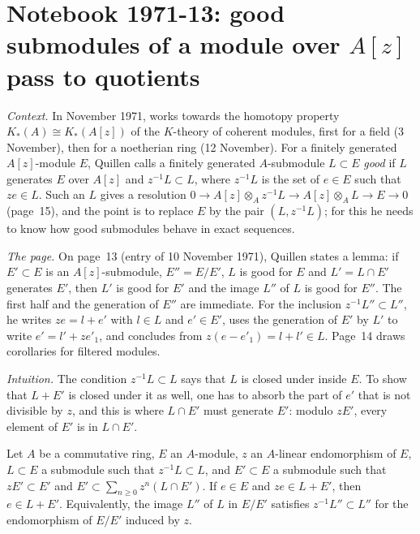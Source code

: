 \section[Notebook 1971-13: good submodules pass to quotients]{Notebook 1971-13: good submodules of a module over $A[z]$ pass to quotients\protect{}}\label{sec:quillen-1971-13}

\emph{Context.} In November 1971,  works towards the homotopy property $K_*(A) \cong K_*(A[z])$ of the $K$-theory of coherent modules, first for a field (3 November), then for a noetherian ring (12 November). For a finitely generated $A[z]$-module $E$, Quillen calls a finitely generated $A$-submodule $L \subset E$ \emph{good} if $L$ generates $E$ over $A[z]$ and $z^{-1}L \subset L$, where $z^{-1}L$ is the set of $e \in E$ such that $ze \in L$. Such an $L$ gives a resolution $0 \to A[z] \otimes_A z^{-1}L \to A[z] \otimes_A L \to E \to 0$ (page~15), and the point is to replace $E$ by the pair $(L, z^{-1}L)$; for this he needs to know how good submodules behave in exact sequences.

\emph{The page.} On page~13 (entry of 10 November 1971), Quillen states a lemma: if $E' \subset E$ is an $A[z]$-submodule, $E'' = E/E'$, $L$ is good for $E$ and $L' = L \cap E'$ generates $E'$, then $L'$ is good for $E'$ and the image $L''$ of $L$ is good for $E''$. The first half and the generation of $E''$ are immediate. For the inclusion $z^{-1}L'' \subset L''$, he writes $ze = l + e'$ with $l \in L$ and $e' \in E'$, uses the generation of $E'$ by $L'$ to write $e' = l' + z e'_1$, and concludes from $z(e - e'_1) = l + l' \in L$. Page~14 draws corollaries for filtered modules.

\emph{Intuition.} The condition $z^{-1}L \subset L$ says that $L$ is closed under  inside $E$. To show that $L + E'$ is closed under it as well, one has to absorb the part of $e'$ that is not divisible by $z$, and this is where $L \cap E'$ must generate $E'$: modulo $z E'$, every element of $E'$ is in $L \cap E'$.

\begin{encadre}
\begin{theoreme}\label{thm:quillen-1971-13}
Let $A$ be a commutative ring, $E$ an $A$-module, $z$ an $A$-linear endomorphism of $E$, $L \subset E$ a submodule such that $z^{-1}L \subset L$, and $E' \subset E$ a submodule such that $zE' \subset E'$ and $E' \subset \sum_{n \ge 0} z^n (L \cap E')$. If $e \in E$ and $ze \in L + E'$, then $e \in L + E'$. Equivalently, the image $L''$ of $L$ in $E/E'$ satisfies $z^{-1}L'' \subset L''$ for the endomorphism of $E/E'$ induced by $z$.
\end{theoreme}
\end{encadre}

